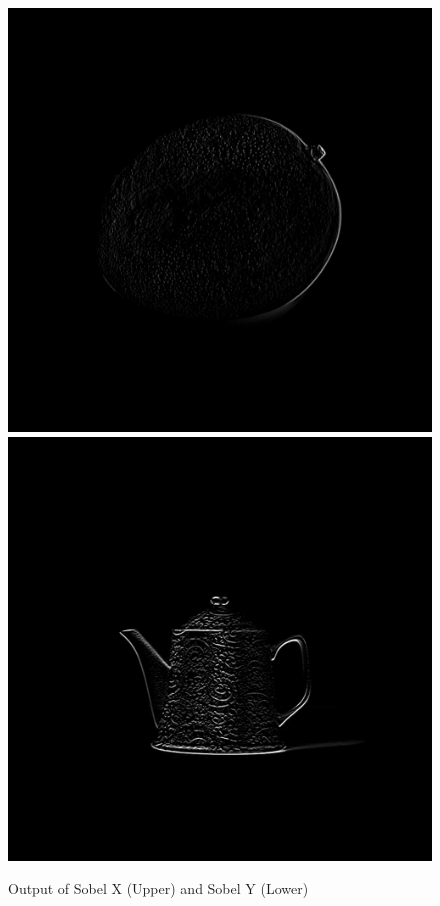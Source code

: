 \documentclass[12pt,a4paper]{report}
\begin{document}
\begin{figure}[!htb]
    \centering
      \includegraphics[height=0.4\paperheight]{output/sobel_x.jpg}
      \includegraphics[height=0.4\paperheight]{output/sobel_y.jpg}
    \caption{Output of Sobel X (Upper) and Sobel Y (Lower)}
\end{figure}
\clearpage
\end{document}
